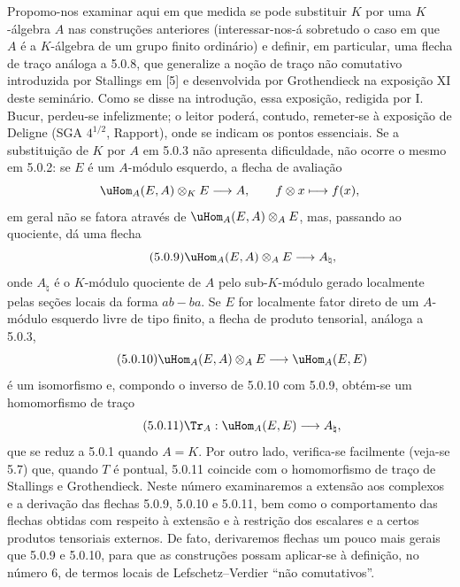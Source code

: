 Propomo-nos examinar aqui em que medida se pode substituir $K$ por uma $K$-álgebra $A$ nas construções anteriores (interessar-nos-á sobretudo o caso em que $A$ é a $K$-álgebra de um grupo finito ordinário) e definir, em particular, uma flecha de traço análoga a 5.0.8, que generalize a noção de traço não comutativo introduzida por Stallings em [5] e desenvolvida por Grothendieck na exposição XI deste seminário. Como se disse na introdução, essa exposição, redigida por I. Bucur, perdeu-se infelizmente; o leitor poderá, contudo, remeter-se à exposição de Deligne (SGA $4^{1/2}$, Rapport), onde se indicam os pontos essenciais. Se a substituição de $K$ por $A$ em 5.0.3 não apresenta dificuldade, não ocorre o mesmo em 5.0.2: se $E$ é um $A$-módulo esquerdo, a flecha de avaliação
\[
\uHom_A(E,A)\otimes_KE\longrightarrow A,
\qquad f\otimes x\longmapsto f(x),
\]
em geral não se fatora através de $\uHom_A(E,A)\otimes_AE$, mas, passando ao quociente, dá uma flecha
\begin{equation}\tag{5.0.9}
\uHom_A(E,A)\otimes_AE\longrightarrow A_\natural,
\end{equation}
onde $A_\natural$ é o $K$-módulo quociente de $A$ pelo sub-$K$-módulo gerado localmente pelas seções locais da forma $ab-ba$. Se $E$ for localmente fator direto de um $A$-módulo esquerdo livre de tipo finito, a flecha de produto tensorial, análoga a 5.0.3,
\begin{equation}\tag{5.0.10}
\uHom_A(E,A)\otimes_AE\longrightarrow\uHom_A(E,E)
\end{equation}
é um isomorfismo e, compondo o inverso de 5.0.10 com 5.0.9, obtém-se um homomorfismo de traço
\begin{equation}\tag{5.0.11}
\Tr_A:\uHom_A(E,E)\longrightarrow A_\natural,
\end{equation}
que se reduz a 5.0.1 quando $A=K$. Por outro lado, verifica-se facilmente (veja-se 5.7) que, quando $T$ é pontual, 5.0.11 coincide com o homomorfismo de traço de Stallings e Grothendieck. Neste número examinaremos a extensão aos complexos e a derivação das flechas 5.0.9, 5.0.10 e 5.0.11, bem como o comportamento das flechas obtidas com respeito à extensão e à restrição dos escalares e a certos produtos tensoriais externos. De fato, derivaremos flechas um pouco mais gerais que 5.0.9 e 5.0.10, para que as construções possam aplicar-se à definição, no número 6, de termos locais de Lefschetz--Verdier ``não comutativos''.

